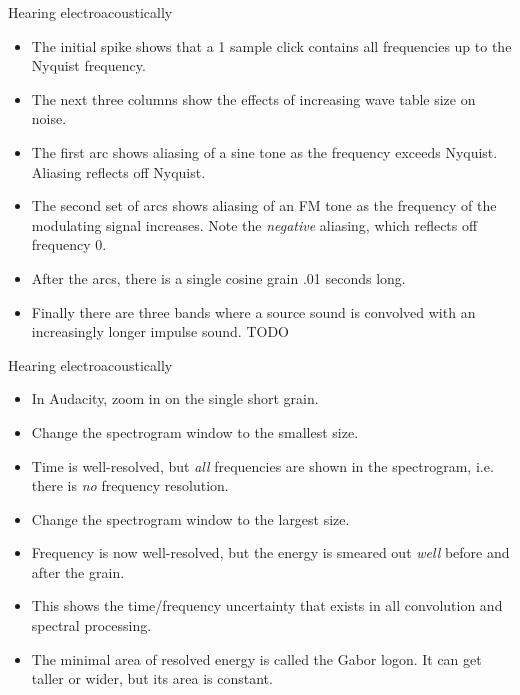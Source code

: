 \documentclass{beamer}
\begin{document}
\begin{frame}{Hearing electroacoustically}
\begin{itemize}
\item The initial spike shows that a 1 sample click contains all frequencies up to the Nyquist frequency.
\item The next three columns show the effects of increasing wave table size on noise.
\item The first arc shows aliasing of a sine tone as the frequency exceeds Nyquist. Aliasing reflects off Nyquist.
\item The second set of arcs shows aliasing of an FM tone as the frequency of the modulating signal increases. Note the \emph{negative} aliasing, which reflects off frequency 0.
\item After the arcs, there is a single cosine grain .01 seconds long.
\item Finally there are three bands where a source sound is convolved with an increasingly longer impulse sound. TODO
\end{itemize}
\end{frame}

\begin{frame}{Hearing electroacoustically}
\begin{itemize}
\item In Audacity, zoom in on the single short grain.
\item Change the spectrogram window to the smallest size.
\item Time is well-resolved, but \emph{all} frequencies are shown in the spectrogram, i.e. there is \emph{no} frequency resolution.
\item Change the spectrogram window to the largest size.
\item Frequency is now well-resolved, but the energy is smeared out \emph{well} before and after the grain.
\item This shows the time/frequency uncertainty that exists in all convolution and spectral processing.
\item The minimal area of resolved energy is called the Gabor logon. It can get taller or wider, but its area is constant.
\end{itemize}
\end{frame}
\end{document}
